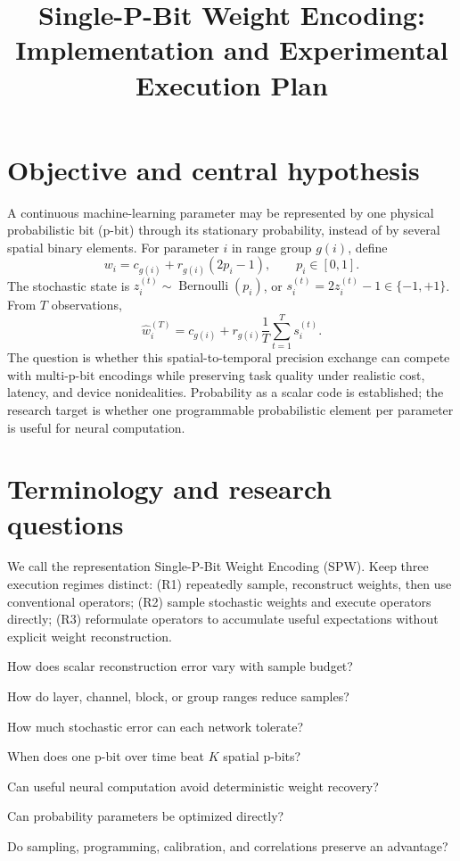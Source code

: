 \documentclass[11pt]{article}
\title{Single-P-Bit Weight Encoding:\\Implementation and Experimental Execution Plan}
\author{}
\date{}
\newcommand{\Bern}{\operatorname{Bernoulli}}
\newcommand{\ours}{\textsc{SPW}}
\begin{document}
\maketitle
\tableofcontents

\section{Objective and central hypothesis}
A continuous machine-learning parameter may be represented by one physical
probabilistic bit (p-bit) through its stationary probability, instead of by several
spatial binary elements. For parameter $i$ in range group $g(i)$, define
\begin{equation}
 w_i=c_{g(i)}+r_{g(i)}(2p_i-1),\qquad p_i\in[0,1].
 \label{eq:weightmap}
\end{equation}
The stochastic state is $z_i^{(t)}\sim\Bern(p_i)$, or
$s_i^{(t)}=2z_i^{(t)}-1\in\{-1,+1\}$. From $T$ observations,
\begin{equation}
 \hat w_i^{(T)}=c_{g(i)}+r_{g(i)}\frac1T\sum_{t=1}^T s_i^{(t)}.
 \label{eq:temporalestimate}
\end{equation}
The question is whether this spatial-to-temporal precision exchange can compete with
multi-p-bit encodings while preserving task quality under realistic cost, latency, and
device nonidealities. Probability as a scalar code is established; the research target
is whether one programmable probabilistic element per parameter is useful for neural
computation.

\section{Terminology and research questions}
We call the representation Single-P-Bit Weight Encoding (\ours). Keep three execution
regimes distinct: (R1) repeatedly sample, reconstruct weights, then use conventional
operators; (R2) sample stochastic weights and execute operators directly; (R3) reformulate
operators to accumulate useful expectations without explicit weight reconstruction.

\begin{description}[leftmargin=!,labelwidth=2.3cm]
\item[RQ1 Representation] How does scalar reconstruction error vary with sample budget?
\item[RQ2 Localization] How do layer, channel, block, or group ranges reduce samples?
\item[RQ3 Robustness] How much stochastic error can each network tolerate?
\item[RQ4 Tradeoff] When does one p-bit over time beat $K$ spatial p-bits?
\item[RQ5 Execution] Can useful neural computation avoid deterministic weight recovery?
\item[RQ6 Training] Can probability parameters be optimized directly?
\item[RQ7 Hardware] Do sampling, programming, calibration, and correlations preserve an advantage?
\end{description}
\end{document}
